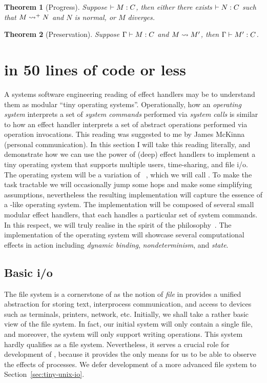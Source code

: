 \documentclass[12pt,phd,lfcs,twoside,openright,logo,leftchapter,normalheadings]{infthesis}
\theoremstyle{plain}
\newtheorem{theorem}{Theorem}[chapter]
\theoremstyle{definition}
\begin{document}
\begin{theorem}[Progress]
  Suppose $\vdash M : C$, then either there exists $\vdash N : C$
  such that $M \leadsto^+ N$ and $N$ is normal, or $M$ diverges.
\end{theorem}

%
\begin{theorem}[Preservation]
  Suppose $\Gamma \vdash M : C$ and $M \leadsto M'$, then
  $\Gamma \vdash M' : C$.
\end{theorem}

\section{\OSname{} in 50 lines of code or less}
\label{sec:deep-handlers-in-action}

A systems software engineering reading of effect handlers may be to
understand them as modular ``tiny operating systems''. Operationally,
how an \emph{operating system} interprets a set of \emph{system
  commands} performed via \emph{system calls} is similar to how an
effect handler interprets a set of abstract operations performed via
operation invocations.
%
This reading was suggested to me by James McKinna (personal
communication). In this section I will take this reading literally,
and demonstrate how we can use the power of (deep) effect handlers to
implement a tiny operating system that supports multiple users,
time-sharing, and file i/o.
%
The operating system will be a variation of \UNIX{}~\cite{RitchieT74},
which we will call \OSname{}.
%
To make the task tractable we will occasionally jump some hops and
make some simplifying assumptions, nevertheless the resulting
implementation will capture the essence of a \UNIX{}-like operating
system.
%
The implementation will be composed of several small modular effect
handlers, that each handles a particular set of system commands. In
this respect, we will truly realise \OSname{} in the spirit of the
\UNIX{} philosophy~\cite[Section~1.6]{Raymond03}.  The implementation of
the operating system will showcase several computational effects in
action including \emph{dynamic binding}, \emph{nondeterminism}, and
\emph{state}.

\subsection{Basic i/o}
\label{sec:tiny-unix-bio}

The file system is a cornerstone of \UNIX{} as the notion of \emph{file}
in \UNIX{} provides a unified abstraction for storing text, interprocess
communication, and access to devices such as terminals, printers,
network, etc.
%
Initially, we shall take a rather basic view of the file system. In
fact, our initial system will only contain a single file, and
moreover, the system will only support writing operations. This system
hardly qualifies as a \UNIX{} file system. Nevertheless, it serves a
crucial role for development of \OSname{}, because it provides the
only means for us to be able to observe the effects of processes.
%
We defer development of a more advanced file system to
Section~\ref{sec:tiny-unix-io}.
\end{document}
